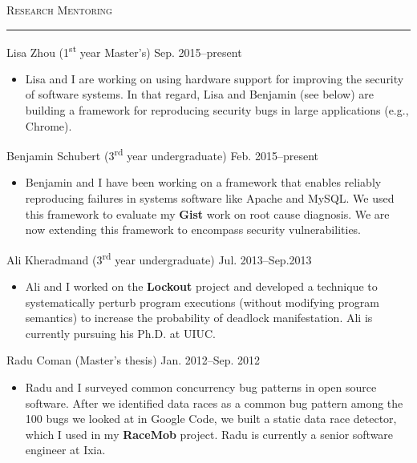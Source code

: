 \documentclass[10pt]{article}
\newcommand{\mysec}[1]{\vspace{2em}\textsc{\large #1}\vspace{1mm}\hrule\vspace{2mm}}
\newcommand{\myssub}[1]{\hspace*{2mm}\parbox{163mm}{#1}\vspace*{2mm}}
\begin{document}
\mysec{Research Mentoring}

\myssub{\vspace{2mm}Lisa Zhou (1\textsuperscript{st} year Master's) \hfill Sep. 2015--present
\begin{itemize}
\setlength\itemsep{0em}
\item{Lisa and I are working on using hardware support for improving the security of software systems. In that regard, Lisa and Benjamin (see below) are building a framework for reproducing security bugs in large applications (e.g., Chrome).}
\end{itemize}
}

\myssub{Benjamin Schubert (3\textsuperscript{rd} year undergraduate) \hfill Feb. 2015--present
\begin{itemize}
\setlength\itemsep{0em}
\item{Benjamin and I have been working on a framework that enables reliably reproducing failures in systems software like Apache and MySQL. We used this framework to evaluate my \textbf{Gist} work on root cause diagnosis. We are now extending this framework to encompass security vulnerabilities.}
\end{itemize}
}

\myssub{Ali Kheradmand (3\textsuperscript{rd} year undergraduate) \hfill Jul. 2013--Sep.2013
\begin{itemize}
\setlength\itemsep{0em}
\item{Ali and I worked on the \textbf{Lockout} project and developed a technique to systematically perturb program executions (without modifying program semantics) to increase the probability of deadlock manifestation. Ali is currently pursuing his Ph.D. at UIUC.}
\end{itemize}
}

\myssub{Radu Coman (Master's thesis) \hfill Jan. 2012--Sep. 2012
\begin{itemize}
\setlength\itemsep{0em}
\item{Radu and I surveyed common concurrency bug patterns in open source software. After we identified data races as a common bug pattern among the 100 bugs we looked at in Google Code, we built a static data race detector, which I used in my \textbf{RaceMob} project. Radu is currently a senior software engineer at Ixia.}
\end{itemize}
}

\end{document}
